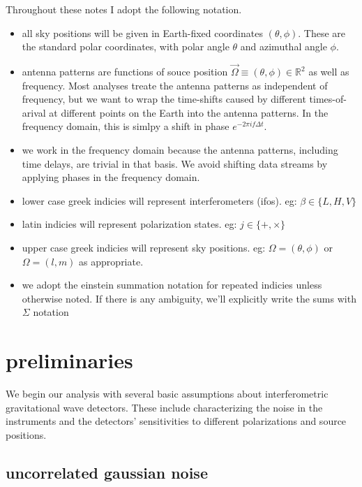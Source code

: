 \documentclass[10pt]{article}
\begin{document}
Throughout these notes I adopt the following notation. 
\begin{itemize}
	\item{all sky positions will be given in Earth-fixed coordinates $(\theta, \phi)$. These are the standard polar coordinates, with polar angle $\theta$ and azimuthal angle $\phi$.}
	\item{antenna patterns are functions of souce position $\vec{\Omega}\equiv(\theta,\phi) \in \mathbb{R}^2$ as well as frequency. Most analyses treate the antenna patterns as independent of frequency, but we want to wrap the time-shifts caused by different times-of-arival at different points on the Earth into the antenna patterns. In the frequency domain, this is simlpy a shift in phase $e^{-2\pi i f\Delta t}$.}
        \item{we work in the frequency domain because the antenna patterns, including time delays, are trivial in that basis. We avoid shifting data streams by applying phases in the frequency domain.}
	\item{lower case greek indicies will represent interferometers (ifos). eg: $\beta\in\{L, H, V\}$}
	\item{latin indicies will represent polarization states. eg: $j \in \{+,\times\}$}
	\item{upper case greek indicies will represent sky positions. eg: $\Omega = (\theta,\phi)$ or $\Omega = (l,m)$ as appropriate.}
	\item{we adopt the einstein summation notation for repeated indicies unless otherwise noted. If there is any ambiguity, we'll explicitly write the sums with $\Sigma$ notation}
\end{itemize}



\section{preliminaries}

We begin our analysis with several basic assumptions about interferometric gravitational wave detectors. These include characterizing the noise in the instruments and the detectors' sensitivities to different polarizations and source positions.

\subsection{uncorrelated gaussian noise}
\end{document}
